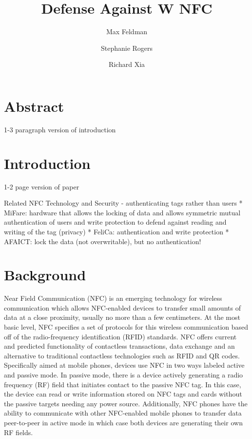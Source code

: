 \documentclass[12pt]{article}
\begin{document}
\title{Defense Against W NFC}
\author{Max Feldman \and Stephanie Rogers \and Richard Xia}
\maketitle

\section{Abstract}
1-3 paragraph version of introduction

\section{Introduction}
1-2 page version of paper



Related NFC Technology and Security - authenticating tags rather than users
* MiFare: hardware that allows the locking of data and allows symmetric mutual authentication of users and write protection to defend against reading and writing of the tag (privacy)
* FeliCa: authentication and write protection 
* AFAICT: lock the data (not overwritable), but no authentication!

\section{Background}
Near Field Communication (NFC) is an emerging technology for wireless communication which allows NFC-enabled devices to transfer small amounts of data at a close proximity, usually no more than a few centimeters. At the most basic level, NFC specifies a set of protocols for this wireless communication based off of the radio-frequency identification (RFID) standards. NFC offers current and predicted functionality of contactless transactions, data exchange and an alternative to traditional contactless technologies such as RFID and QR codes. Specifically aimed at mobile phones, devices use NFC in two ways labeled active and passive mode. In passive mode, there is a device actively generating a radio frequency (RF) field that initiates contact to the passive NFC tag. In this case, the device can read or write information stored on NFC tags and cards without the passive targets needing any power source. Additionally, NFC phones have the ability to communicate with other NFC-enabled mobile phones to transfer data peer-to-peer in active mode in which case both devices are generating their own RF fields.
\end{document}
